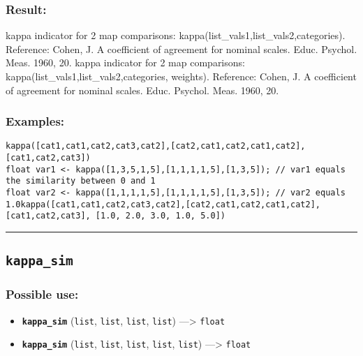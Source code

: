\documentclass[]{book}
\providecommand{\tightlist}{%
  \setlength{\itemsep}{0pt}\setlength{\parskip}{0pt}}
\theoremstyle{definition}
\theoremstyle{definition}
\theoremstyle{definition}
\theoremstyle{remark}
\begin{document}
\subsubsection{Result:}\label{result-301}

kappa indicator for 2 map comparisons:
kappa(list\_vals1,list\_vals2,categories). Reference: Cohen, J. A
coefficient of agreement for nominal scales. Educ. Psychol. Meas. 1960,
20. kappa indicator for 2 map comparisons:
kappa(list\_vals1,list\_vals2,categories, weights). Reference: Cohen, J.
A coefficient of agreement for nominal scales. Educ. Psychol. Meas.
1960, 20.

\subsubsection{Examples:}\label{examples-218}

\begin{verbatim}
kappa([cat1,cat1,cat2,cat3,cat2],[cat2,cat1,cat2,cat1,cat2],[cat1,cat2,cat3])  
float var1 <- kappa([1,3,5,1,5],[1,1,1,1,5],[1,3,5]); // var1 equals the similarity between 0 and 1 
float var2 <- kappa([1,1,1,1,5],[1,1,1,1,5],[1,3,5]); // var2 equals 1.0kappa([cat1,cat1,cat2,cat3,cat2],[cat2,cat1,cat2,cat1,cat2],[cat1,cat2,cat3], [1.0, 2.0, 3.0, 1.0, 5.0]) 
\end{verbatim}

\begin{center}\rule{0.5\linewidth}{\linethickness}\end{center}

\subsection{\texorpdfstring{\texttt{kappa\_sim}}{kappa\_sim}}\label{kappa_sim}

\subsubsection{Possible use:}\label{possible-use-312}

\begin{itemize}
\tightlist
\item
  \textbf{\texttt{kappa\_sim}} (\texttt{list}, \texttt{list},
  \texttt{list}, \texttt{list}) ---\textgreater{} \texttt{float}
\item
  \textbf{\texttt{kappa\_sim}} (\texttt{list}, \texttt{list},
  \texttt{list}, \texttt{list}, \texttt{list}) ---\textgreater{}
  \texttt{float}
\end{itemize}
\end{document}
